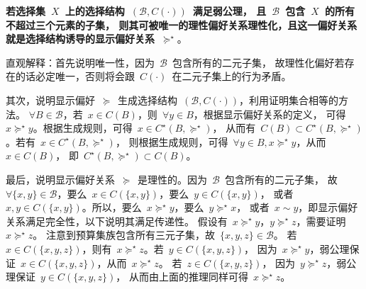 \documentclass[a4paper,12pt]{article}
\begin{document}
\textbf{若选择集~$X$~上的选择结构~$(\mathcal{B},C(\cdot))$~满足弱公理，
且~$\mathcal{B}$~包含~$X$~的所有不超过三个元素的子集，
则其可被唯一的理性偏好关系理性化，且这一偏好关系就是选择结构诱导的显示偏好关系~$\succeq^\star$}。

直观解释：首先说明唯一性，因为~$\mathcal{B}$~包含所有的二元子集，
故理性化偏好若存在的话必定唯一，否则将会跟~$C(\cdot)$~在二元子集上的行为矛盾。

其次，说明显示偏好~$\succeq$~生成选择结构~$(\mathcal{B},C(\cdot))$，利用证明集合相等的方法。
$\forall B\in\mathcal{B}$，若~$x\in C(B)$，则~$\forall y\in B$，根据显示偏好关系的定义，
可得~$x\succeq^\star y$。根据生成规则，可得~$x\in C^\star(B,\succeq^\star)$，
从而有~$C(B)\subset C^\star(B,\succeq^\star)$。若有~$x\in C^\star(B,\succeq^\star)$，
则根据生成规则，可得~$\forall y\in B, x\succeq^\star y$，从而~$x\in C(B)$，
即~$C^\star(B,\succeq^\star)\subset C(B)$。

最后，说明显示偏好关系~$\succeq$~是理性的。因为~$\mathcal{B}$~包含所有的二元子集，
故~$\forall \{x,y\}\in\mathcal{B}$，要么~$x\in C(\{x,y\})$，要么~$y\in C(\{x,y\})$，
或者~$x,y\in C(\{x,y\})$。所以，要么~$x\succeq^\star y$，要么~$y\succeq^\star x$，
或者~$x\sim y$，即显示偏好关系满足完全性，以下说明其满足传递性。
假设有~$x\succeq^\star y$，$y\succeq^\star z$，需要证明~$x\succeq^\star z$。
注意到预算集族包含所有三元子集，故~$\{x,y,z\}\in\mathcal{B}$。
若~$x\in C(\{x,y,z\})$，则有~$x\succeq^\star z$。若~$y\in C(\{x,y,z\})$，
因为~$x\succeq^\star y$，弱公理保证~$x\in C(\{x,y,z\})$，从而~$x\succeq^\star z$。
若~$z\in C(\{x,y,z\})$，
因为~$y\succeq^\star z$，弱公理保证~$y\in C(\{x,y,z\})$，
从而由上面的推理同样可得~$x\succeq^\star z$。
\end{document}
